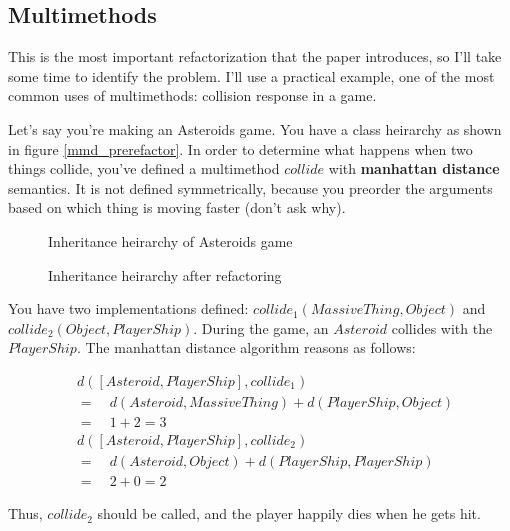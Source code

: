 \documentclass[12pt]{article}
\begin{document}
\subsection{Multimethods}

\label{problem:multimethods}

This is the most important refactorization that the paper introduces, so
I'll take some time to identify the problem.  I'll use a practical
example, one of the most common uses of multimethods: collision response
in a game.

Let's say you're making an Asteroids game.  You have a class heirarchy
as shown in figure \vref{mmd_prerefactor}.  In order to determine what
happens when two things collide, you've defined a multimethod
$\mathit{collide}$ with \textbf{manhattan distance} semantics.  It is
not defined symmetrically, because you preorder the arguments based on
which thing is moving faster (don't ask why).

\begin{figure}
\caption{Inheritance heirarchy of Asteroids game}
\label{mmd_prerefactor}
\end{figure}

\begin{figure}
\caption{Inheritance heirarchy after refactoring}
\label{mmd_postrefactor}
\end{figure}

You have two implementations defined:
$\mathit{collide}_1(\mathit{MassiveThing}, \mathit{Object})$ and
$\mathit{collide}_2(\mathit{Object}, \mathit{PlayerShip})$.  During the
game, an $\mathit{Asteroid}$ collides with the $\mathit{PlayerShip}$.
The manhattan distance algorithm reasons as follows:

\begin{align*}
& d([\mathit{Asteroid},\mathit{PlayerShip}], \mathit{collide}_1) \\
& = \quad d(\mathit{Asteroid}, \mathit{MassiveThing}) + 
    d(\mathit{PlayerShip}, \mathit{Object}) \\
& = \quad 1 + 2 = 3 \\ 
& d([\mathit{Asteroid},\mathit{PlayerShip}], \mathit{collide}_2) \\
& = \quad d(\mathit{Asteroid}, \mathit{Object}) + 
    d(\mathit{PlayerShip}, \mathit{PlayerShip}) \\
& = \quad 2 + 0 = 2
\end{align*}

Thus, $\textit{collide}_2$ should be called, and the player
happily dies when he gets hit.
\end{document}
